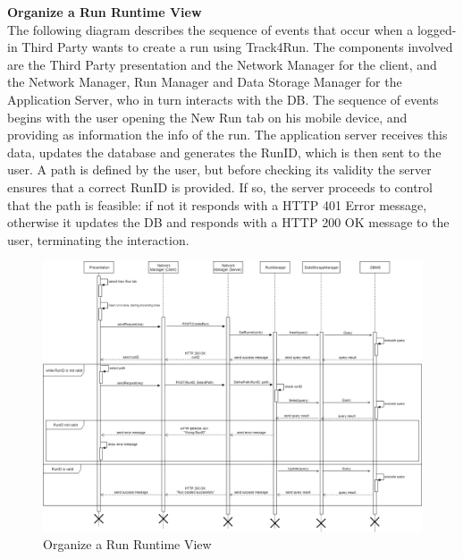 \documentclass[titlepage]{article}
\begin{document}
{\bf Organize a Run Runtime View }\\ 
The following diagram describes the sequence of events that occur when a logged-in Third Party wants to create a run using Track4Run.
The components involved are the Third Party presentation and the Network Manager for the client, and the Network Manager, Run Manager and Data Storage Manager for the Application Server, who in turn interacts with the DB.
The sequence of events begins with the user opening the New Run tab on his mobile device, and providing as information the info of the run. The application server receives this data, updates the database and generates the RunID, which is then sent to the user. A path is defined by the user, but before checking its validity the server ensures that a correct RunID is provided. If so, the server proceeds to control that the path is feasible: if not it responds with a HTTP 401 Error message, otherwise it updates the DB and responds with a HTTP 200 OK message to the user, terminating the interaction.

\begin{figure}[H]
	\center
  	\includegraphics[width=15cm]{Organize.png}
  	\caption{Organize a Run Runtime View}
 	\label{fig:ORG}
\end{figure}
\end{document}
